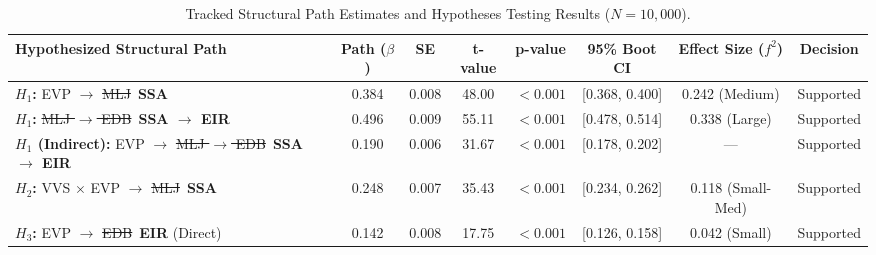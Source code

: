 \documentclass[11pt,a4paper]{article}
\newcommand{\textadded}[1]{{\color{blue!80!black}\textbf{#1}}}
\newcommand{\textdeleted}[1]{{\color{red!70!black}\sout{#1}}}
\begin{document}
\begin{table}[htbp]
\centering
\small
\setlength{\tabcolsep}{4pt}
\begin{tabularx}{\textwidth}{Xccccccc}
\toprule
\textbf{Hypothesized Structural Path} & \textbf{Path ($\beta$)} & \textbf{SE} & \textbf{t-value} & \textbf{p-value} & \textbf{95\% Boot CI} & \textbf{Effect Size ($f^2$)} & \textbf{Decision} \\
\midrule
\textbf{$H_1$:} EVP $\rightarrow$ \textdeleted{MLJ}\ \textadded{SSA} & 0.384 & 0.008 & 48.00 & $< 0.001$ & [0.368, 0.400] & 0.242 (Medium) & Supported \\
\textbf{$H_1$:} \textdeleted{MLJ $\rightarrow$ EDB}\ \textadded{SSA $\rightarrow$ EIR} & 0.496 & 0.009 & 55.11 & $< 0.001$ & [0.478, 0.514] & 0.338 (Large) & Supported \\
\textbf{$H_1$ (Indirect):} EVP $\rightarrow$ \textdeleted{MLJ $\rightarrow$ EDB}\ \textadded{SSA $\rightarrow$ EIR} & 0.190 & 0.006 & 31.67 & $< 0.001$ & [0.178, 0.202] & --- & Supported \\
\addlinespace
\textbf{$H_2$:} VVS $\times$ EVP $\rightarrow$ \textdeleted{MLJ}\ \textadded{SSA} & 0.248 & 0.007 & 35.43 & $< 0.001$ & [0.234, 0.262] & 0.118 (Small-Med) & Supported \\
\addlinespace
\textbf{$H_3$:} EVP $\rightarrow$ \textdeleted{EDB}\ \textadded{EIR} (Direct) & 0.142 & 0.008 & 17.75 & $< 0.001$ & [0.126, 0.158] & 0.042 (Small) & Supported \\
\bottomrule
\end{tabularx}
\caption{Tracked Structural Path Estimates and Hypotheses Testing Results ($N = 10,000$).}
\label{tab:tracked_structural_results}
\end{table}
\end{document}
